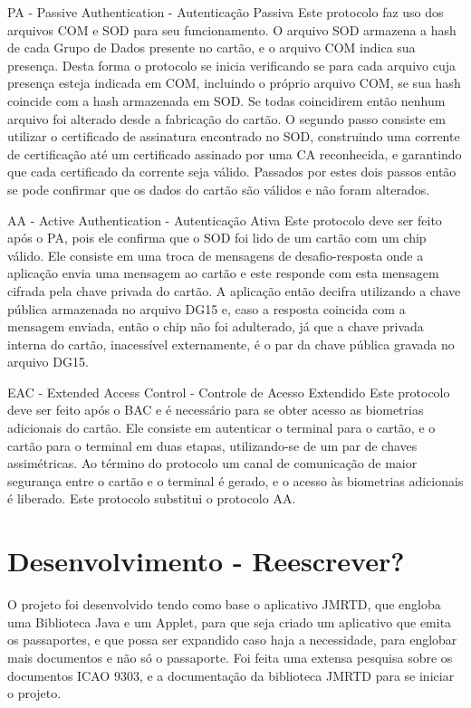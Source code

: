 \documentclass[11pt]{article}
\begin{document}
		 PA - Passive Authentication - Autenticação Passiva
		 Este protocolo faz uso dos arquivos COM e SOD para seu funcionamento. O arquivo SOD armazena a hash de cada Grupo de Dados presente no cartão, e o arquivo COM indica sua presença. Desta forma o protocolo se inicia verificando se para cada arquivo cuja presença esteja indicada em COM, incluindo o próprio arquivo COM, se sua hash coincide com a hash armazenada em SOD. Se todas coincidirem então nenhum arquivo foi alterado desde a fabricação do cartão.
		 O segundo passo consiste em utilizar o certificado de assinatura encontrado no SOD, construindo uma corrente de certificação até um certificado assinado por uma CA reconhecida, e garantindo que cada certificado da corrente seja válido. Passados por estes dois passos então se pode confirmar que os dados do cartão são válidos e não foram alterados.
		
		 AA - Active Authentication - Autenticação Ativa
		 Este protocolo deve ser feito após o PA, pois ele confirma que o SOD foi lido de um cartão com um chip válido. Ele consiste em uma troca de mensagens de desafio-resposta onde a aplicação envia uma mensagem ao cartão e este responde com esta mensagem cifrada pela chave privada do cartão. A aplicação então decifra utilizando a chave pública armazenada no arquivo DG15 e, caso a resposta coincida com a mensagem enviada, então o chip não foi adulterado, já que a chave privada interna do cartão, inacessível externamente, é o par da chave pública gravada no arquivo DG15.
		
		 EAC - Extended Access Control - Controle de Acesso Extendido
		 Este protocolo deve ser feito após o BAC e é necessário para se obter acesso as biometrias adicionais do cartão. Ele consiste em autenticar o terminal para o cartão, e o cartão para o terminal em duas etapas, utilizando-se de um par de chaves assimétricas. Ao término do protocolo um canal de comunicação de maior segurança entre o cartão e o terminal é gerado, e o acesso às biometrias adicionais é liberado. Este protocolo substitui o protocolo AA.
			
		

	\section{Desenvolvimento - Reescrever? }
		
			
		O projeto foi desenvolvido tendo como base o aplicativo JMRTD, que engloba uma Biblioteca Java e um Applet, para que seja criado um aplicativo que emita os passaportes, e que possa ser expandido caso haja a necessidade, para englobar mais documentos e não só o passaporte.
		Foi feita uma extensa pesquisa sobre os documentos ICAO 9303, e a documentação da biblioteca JMRTD para se iniciar o projeto.
		
\end{document}
